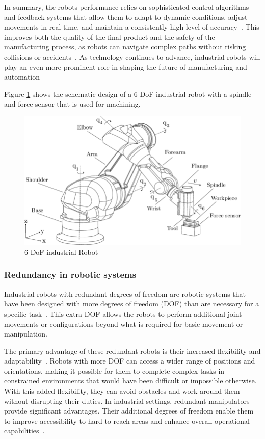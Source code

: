 In summary, the robots performance relies on sophisticated control algorithms and feedback systems that allow them to adapt to dynamic conditions, adjust movements in real-time, and maintain a consistently high level of accuracy~\cite{Lin.2023}. This improves both the quality of the final product and the safety of the manufacturing process, as robots can navigate complex paths without risking collisions or accidents~\cite{Bosscher.2011}.
As technology continues to advance, industrial robots will play an even more prominent role in shaping the future of manufacturing and automation~\cite{Domae.2019}


Figure \ref{robot} shows the schematic design of a 6-DoF industrial robot with a spindle and force sensor that is used for machining.

\begin{figure}[H]
	\centerline{\includegraphics[scale=.4]{figures/robot.png}}
	\caption{6-DoF industrial Robot~\cite{HuynhHoaiNam.2018}}
	\label{robot}
\end{figure}


\subsubsection{Redundancy in robotic systems}

Industrial robots with redundant degrees of freedom are robotic systems that have been designed with more degrees of freedom (DOF) than are necessary for a specific task~\cite{Liu.2022}. This extra DOF allows the robots to perform additional joint movements or configurations beyond what is required for basic movement or manipulation.

The primary advantage of these redundant robots is their increased flexibility and adaptability~\cite{Duong.2021}. Robots with more DOF can access a wider range of positions and orientations, making it possible for them to complete complex tasks in constrained environments that would have been difficult or impossible otherwise. With this added flexibility, they can avoid obstacles and work around them without disrupting their duties. In industrial settings, redundant manipulators provide significant advantages. Their additional degrees of freedom enable them to improve accessibility to hard-to-reach areas and enhance overall operational capabilities~\cite{Shi.2021}. 

